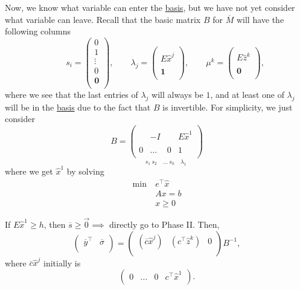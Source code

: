 Now, we know what variable can enter the \hyperref[def:basic]{basis}, but we have not yet consider what variable can leave. Recall that the basic matrix \(B\) for \(\overline{M}\)
will have the following columns
\[
	\qquad s_{i} = \begin{pmatrix}
		0      \\
		1      \\
		\vdots \\
		0      \\
		\bm{0} \\
	\end{pmatrix}, \qquad \lambda_{j} = \begin{pmatrix}
		\\
		E \hat{x}^j \\
		\\
		\bm{1}      \\
	\end{pmatrix}, \qquad \mu^k =\begin{pmatrix}
		\\
		E \hat{z}^k \\
		\\
		\bm{0}      \\
	\end{pmatrix},
\]
where we see that the last entries of \(\lambda_{j}\) will always be \(1\), and at least one of \(\lambda_{j}\) will be in the \hyperref[def:basic]{basis} due to the fact
that \(B\) is invertible. For simplicity, we just consider
\[
	B = \underset{s_1\ s_2\quad \ldots\ s_k\quad \lambda_1}{
		\begin{pmatrix}
			  &        &   &             \\
			  & -I     &   & E \hat{x}^1 \\
			  &        &   &             \\
			0 & \ldots & 0 & 1           \\
		\end{pmatrix}}
\]
where we get \(\hat{x}^1\) by solving
\[
	\begin{aligned}
		\min~ & e^{\top}\hat{x} \\
		      & Ax = b          \\
		      & x\geq 0
	\end{aligned}
\]

If \(E \hat{x}^1\geq h\), then \(\overline{s}\geq \vec{0}\implies\) directly go to Phase II. Then,
\[
	\begin{pmatrix}
		\overline{y}^{\top} & \overline{\sigma} \\
	\end{pmatrix} = \begin{pmatrix}
		(\overline{c}\hat{x}^j) & (c^{\top}\hat{z}^k) & 0 \\
	\end{pmatrix}B^{-1},
\]
where \(\overline{c}\hat{x}^j\) initially is
\[
	\begin{pmatrix}
		0 & \ldots & 0 & c^{\top}\hat{x}^1 \\
	\end{pmatrix}.
\]

